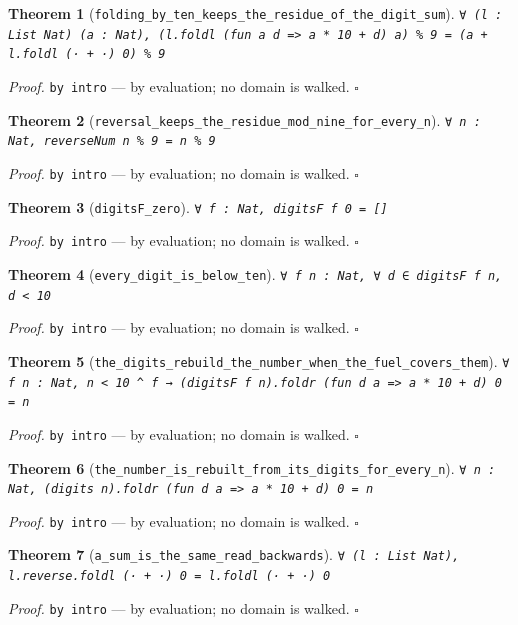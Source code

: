 \documentclass[11pt]{article}
\newtheorem{theorem}{Theorem}[section]
\begin{document}
\begin{theorem}[\texttt{folding\_by\_ten\_keeps\_the\_residue\_of\_the\_digit\_sum}]
\texttt{∀ (l : List Nat) (a : Nat), (l.foldl (fun a d => a * 10 + d) a) \% 9 = (a + l.foldl (· + ·) 0) \% 9}
\end{theorem}
\noindent\emph{Proof.} \texttt{by
  intro} --- by evaluation; no domain is walked. \hfill$\square$

\begin{theorem}[\texttt{reversal\_keeps\_the\_residue\_mod\_nine\_for\_every\_n}]
\texttt{∀ n : Nat, reverseNum n \% 9 = n \% 9}
\end{theorem}
\noindent\emph{Proof.} \texttt{by
  intro} --- by evaluation; no domain is walked. \hfill$\square$

\begin{theorem}[\texttt{digitsF\_zero}]
\texttt{∀ f : Nat, digitsF f 0 = []}
\end{theorem}
\noindent\emph{Proof.} \texttt{by
  intro} --- by evaluation; no domain is walked. \hfill$\square$

\begin{theorem}[\texttt{every\_digit\_is\_below\_ten}]
\texttt{∀ f n : Nat, ∀ d ∈ digitsF f n, d < 10}
\end{theorem}
\noindent\emph{Proof.} \texttt{by
  intro} --- by evaluation; no domain is walked. \hfill$\square$

\begin{theorem}[\texttt{the\_digits\_rebuild\_the\_number\_when\_the\_fuel\_covers\_them}]
\texttt{∀ f n : Nat, n < 10 ^ f → (digitsF f n).foldr (fun d a => a * 10 + d) 0 = n}
\end{theorem}
\noindent\emph{Proof.} \texttt{by
  intro} --- by evaluation; no domain is walked. \hfill$\square$

\begin{theorem}[\texttt{the\_number\_is\_rebuilt\_from\_its\_digits\_for\_every\_n}]
\texttt{∀ n : Nat, (digits n).foldr (fun d a => a * 10 + d) 0 = n}
\end{theorem}
\noindent\emph{Proof.} \texttt{by
  intro} --- by evaluation; no domain is walked. \hfill$\square$

\begin{theorem}[\texttt{a\_sum\_is\_the\_same\_read\_backwards}]
\texttt{∀ (l : List Nat), l.reverse.foldl (· + ·) 0 = l.foldl (· + ·) 0}
\end{theorem}
\noindent\emph{Proof.} \texttt{by
  intro} --- by evaluation; no domain is walked. \hfill$\square$
\end{document}
